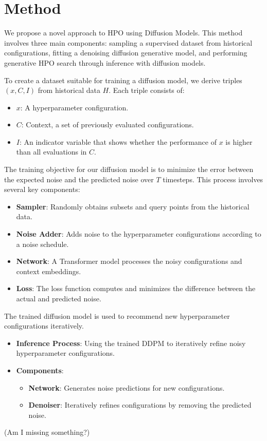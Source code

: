 \documentclass[10pt,a4paper,twocolumn]{article}
\begin{document}
{\section{Method} 
We propose a novel approach to HPO using Diffusion Models. This method involves three main components: sampling a supervised dataset from historical configurations, fitting a denoising diffusion generative model, and performing generative HPO search through inference with diffusion models.

To create a dataset suitable for training a diffusion model, we derive triples \((x, C, I)\) from historical data \(H\). Each triple consists of:
\begin{itemize}
  \item \(x\): A hyperparameter configuration.
  \item \(C\): Context, a set of previously evaluated configurations.
  \item \(I\): An indicator variable that shows whether the performance of \(x\) is higher than all evaluations in \(C\).
\end{itemize}

The training objective for our diffusion model is to minimize the error between the expected noise and the predicted noise over \(T\) timesteps. This process involves several key components:
\begin{itemize}
  \item \textbf{Sampler}: Randomly obtains subsets and query points from the historical data.
  \item \textbf{Noise Adder}: Adds noise to the hyperparameter configurations according to a noise schedule.
  \item \textbf{Network}: A Transformer model processes the noisy configurations and context embeddings.
  \item \textbf{Loss}: The loss function computes and minimizes the difference between the actual and predicted noise.
\end{itemize}

The trained diffusion model is used to recommend new hyperparameter configurations iteratively.
\begin{itemize}
  \item \textbf{Inference Process}: Using the trained DDPM to iteratively refine noisy hyperparameter configurations.
  \item \textbf{Components}:
  \begin{itemize}
    \item \textbf{Network}: Generates noise predictions for new configurations.
    \item \textbf{Denoiser}: Iteratively refines configurations by removing the predicted noise.
  \end{itemize}
\end{itemize}
(Am I missing something?)
}
\end{document}
